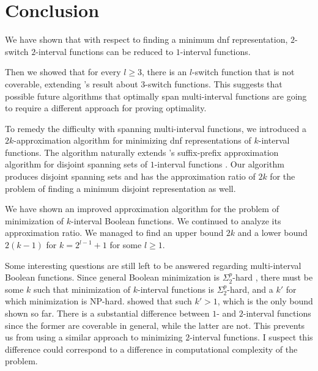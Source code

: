 \chapter*{Conclusion}


We have shown that
with respect to finding
a minimum \acrshort{dnf} representation,
$2$-switch $2$-interval functions
can be reduced to $1$-interval functions.

Then we showed that for every $l \geq 3$,
there is an $l$-switch function that is not coverable,
extending \citeauthor{Dubovsky2012}'s result
about $3$-switch functions.
This suggests that possible future algorithms
that optimally span multi-interval functions
are going to require a different approach
for proving optimality.

To remedy the difficulty with spanning multi-interval
functions,
we introduced a $2k$-approximation algorithm
for minimizing \acrshort{dnf} representations
of $k$-interval functions.
The algorithm naturally extends
\citeauthor{Schieber2005154}'s suffix-prefix
approximation algorithm
for disjoint spanning sets of $1$-interval functions
\citep[section 6]{Schieber2005154}.
Our algorithm produces disjoint spanning sets
and has the approximation ratio of $2k$
for the problem of finding
a minimum disjoint representation as well.

We have shown an improved approximation algorithm for the problem of minimization of $k$-interval Boolean functions.
We continued to analyze its approximation ratio.
We managed to find an upper bound $2k$ and a lower bound $2(k-1)$
for $k = 2^{l-1}+1$ for some $l \geq 1$.

Some interesting questions are still left to be answered
regarding multi-interval Boolean functions.
Since general Boolean minimization is
$\Sigma_2^p$-hard \citep{Umans1998},
there must
be some $k$ such that minimization
of $k$-interval functions is $\Sigma_2^p$-hard,
and a $k'$ for which minimization is NP-hard.
\citeauthor{Schieber2005154} showed that such $k' > 1$,
which is the only bound shown so far.
There is a substantial difference
between $1$- and $2$-interval functions
since the former are coverable in general,
while the latter are not.
This prevents us from using a similar approach
to minimizing $2$-interval functions.
I suspect this difference could correspond to
a difference in computational complexity of the problem.


